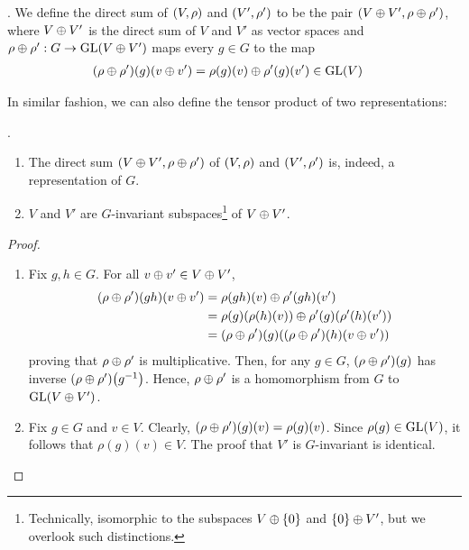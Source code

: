 \begin{boxdefinition} \label{Ch1:Def:Dir_Sum_Reps}
    . We define the direct sum of $\left( V,\rho \right)$ and $\left( V', \rho' \right)$ to be the pair $\left( V \oplus V', \rho \oplus \rho' \right)$, where $V \oplus V'$ is the direct sum of $V$ and $V'$ as vector spaces and $\rho \oplus \rho' : G \to \operatorname{GL}\!\left( V \oplus V' \right)$ maps every $g \in G$ to the map
    \begin{align*}
        \left( \rho \oplus \rho' \right)\!\left( g \right)\!\left( v \oplus v' \right) &= \rho(g)(v) \oplus \rho'(g)(v') \in \operatorname{GL}\!\left( V \right)
    \end{align*}
\end{boxdefinition}
\begin{remark}
    In similar fashion, we can also define the tensor product of two representations: %
\end{remark}
\begin{proposition}
    .
    \begin{enumerate}[label = \normalfont \arabic*., noitemsep]
        \item The direct sum $\left( V \oplus V', \rho \oplus \rho' \right)$ of $\left( V,\rho \right)$ and $\left( V', \rho' \right)$ is, indeed, a representation of $G$.
        \item $V$ and $V'$ are $G$-invariant subspaces\footnote{Technically, isomorphic to the subspaces $V \oplus \left\{ 0 \right\}$ and $\left\{ 0 \right\} \oplus V'$, but we overlook such distinctions.} of $V \oplus V'$.
    \end{enumerate}
\end{proposition}
\begin{proof}
    \hfill
    \begin{enumerate}[noitemsep]
        \item Fix $g,h \in G$. For all $v \oplus v' \in V \oplus V'$,
        \begin{align*}
            \left( \rho \oplus \rho' \right)\!(gh)(v \oplus v') &= \rho(gh)(v) \oplus \rho'(gh)(v') \\
            &= \rho(g)\!\left( \rho(h)(v) \right) \oplus \rho'(g)\!\left( \rho'(h)(v') \right) \\
            &= \left( \rho \oplus \rho' \right)\!(g)\!\left( \left( \rho \oplus \rho' \right)\!(h)(v \oplus v') \right)
        \end{align*}
        proving that $\rho \oplus \rho'$ is multiplicative. Then, for any $g \in G$, $\left( \rho \oplus \rho' \right)\!(g)$ has inverse $\left( \rho \oplus \rho' \right)\!\left( g^{-1} \right)$. Hence, $\rho \oplus \rho'$ is a homomorphism from $G$ to $\operatorname{GL}\!\left( V \oplus V' \right)$.

        \item Fix $g \in G$ and $v \in V$. Clearly, $\left( \rho \oplus \rho' \right)\!(g)(v) = \rho(g)(v)$. Since $\rho(g) \in \operatorname{GL}\!\left( V \right)$, it follows that $\rho(g)(v) \in V$. The proof that $V'$ is $G$-invariant is identical.
    \end{enumerate}
    \vspace{-1em}
\end{proof}

